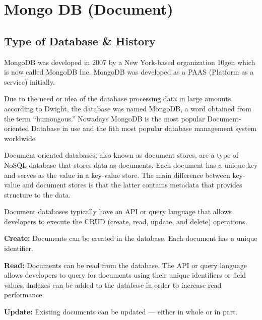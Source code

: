 
\chapter{Mongo DB (Document)} \label{ch:mongo}

\section{Type of Database \& History}
MongoDB was developed in 2007 by a New York-based organization 10gen which is now called MongoDB Inc. MongoDB was developed as a PAAS (Platform as a service) initially.

Due to the need or idea of the database processing data in large amounts, according to Dwight, the database was named MongoDB, a word obtained from the term “humongous.”
Nowadays MongoDB is the most popular Document-oriented Database in use and the fith most popular database management system worldwide

Document-oriented databases, also known as document stores, are a type of NoSQL database that stores data as documents. Each document has a unique key and serves as the value in a key-value store. The main difference between key-value and document stores is that the latter contains metadata that provides structure to the data. 

Document databases typically have an API or query language that allows developers to execute the CRUD (create, read, update, and delete) operations.

\textbf{Create:} Documents can be created in the database. Each document has a unique identifier.

\textbf{Read:} Documents can be read from the database. The API or query language allows developers to query for documents using their unique identifiers or field values. Indexes can be added to the database in order to increase read performance.

\textbf{Update:} Existing documents can be updated — either in whole or in part.

